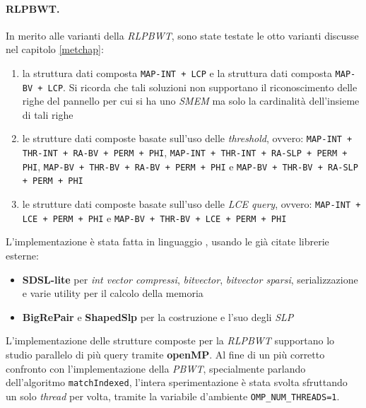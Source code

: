 \paragraph{RLPBWT.}
In merito alle varianti della \textit{RLPBWT}, sono state testate le otto
varianti discusse nel capitolo \ref{metchap}:
\begin{enumerate}
  \item la struttura dati composta \texttt{MAP-INT + LCP} e la struttura dati
  composta \texttt{MAP-BV + LCP}. Si ricorda che tali soluzioni non supportano
  il riconoscimento delle righe del pannello per cui si ha uno \textit{SMEM} ma
  solo la cardinalità dell'insieme di tali righe
  \item le strutture dati composte basate sull'uso delle \textit{threshold},
  ovvero: \texttt{MAP-INT + THR-INT + RA-BV + PERM + PHI},  \texttt{MAP-INT +
    THR-INT + RA-SLP + PERM + PHI}, \texttt{MAP-BV + THR-BV + RA-BV + PERM +
    PHI} e \texttt{MAP-BV + THR-BV + RA-SLP + PERM + PHI} 
  \item le strutture dati composte basate sull'uso delle \textit{LCE query},
  ovvero: \texttt{MAP-INT + LCE + PERM + PHI} e \texttt{MAP-BV + THR-BV +
    LCE + PERM + PHI} 
\end{enumerate}
L'implementazione è stata fatta in linguaggio \Cplusplus, usando le già citate
librerie esterne:
\begin{itemize}
  \item \textbf{SDSL-lite} per \textit{int vector compressi},
  \textit{bitvector}, \textit{bitvector sparsi}, serializzazione e varie utility
  per il calcolo della memoria
  \item \textbf{BigRePair} e \textbf{ShapedSlp} per la costruzione e l'suo degli
  \textit{SLP} 
\end{itemize}
L'implementazione delle strutture composte per la
\textit{RLPBWT} supportano lo studio parallelo di più query tramite
\textbf{openMP}\cite{openmp}. Al fine di un più 
corretto confronto con l'implementazione della \textit{PBWT}, specialmente
parlando dell'algoritmo \texttt{matchIndexed}, l'intera sperimentazione è stata
svolta sfruttando un solo \textit{thread} per volta, tramite la variabile
d'ambiente \texttt{OMP\_NUM\_THREADS=1}.
